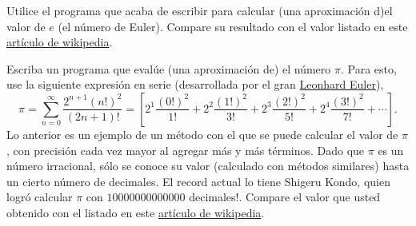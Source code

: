 \documentclass[11pt]{exam}
\begin{document}
\begin{questions}
\item Utilice el programa que acaba de escribir para calcular (una aproximación d)el valor de $e$ (el número de Euler). Compare su resultado con el valor listado en este \href{https://es.wikipedia.org/wiki/N\%C3\%BAmero_e}{artículo de wikipedia}.

\item Escriba un programa que evalúe (una aproximación de) el número $\pi$. Para esto, use la siguiente expresión en serie (desarrollada por el gran \href{https://es.wikipedia.org/wiki/Leonhard_Euler}{Leonhard Euler}),
\begin{equation}
\pi = \sum_{n=0}^{\infty}\frac{2^{n+1}(n!)^2}{(2n+1)!}=\left[2^1\frac{(0!)^2}{1!} + 2^2\frac{(1!)^2}{3!} + 2^3\frac{(2!)^2}{5!} + 2^4 \frac{(3!)^2}{7!} + \cdots \right].
\end{equation}
Lo anterior es un ejemplo de un método con el que se puede calcular el valor de $\pi$, con precisión cada vez mayor al agregar más y más términos. Dado que $\pi$ es un número irracional, sólo se conoce su valor (calculado con métodos similares) hasta un cierto número de decimales. El record actual lo tiene Shigeru Kondo, quien logró calcular $\pi$ con $10 000 000 000 000$ decimales!. Compare el valor que usted obtenido con el listado en este \href{https://es.wikipedia.org/wiki/N\%C3\%BAmero_pi}{artículo de wikipedia}.

\end{questions}
\end{document}
